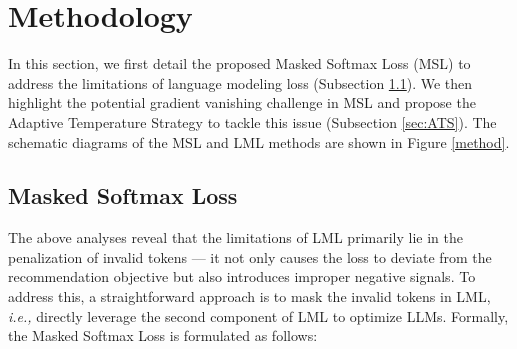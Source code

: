 \documentclass[sigconf,natbib=true]{acmart}
\newcommand{\ie}{\emph{i.e., }}
\begin{document}

\section{Methodology}
In this section, we first detail the proposed Masked Softmax Loss (MSL) to address the limitations of language modeling loss (Subsection \ref{sec:MSL}). We then highlight the potential gradient vanishing challenge in MSL and propose the Adaptive Temperature Strategy to tackle this issue (Subsection \ref{sec:ATS}). The schematic diagrams of the MSL and LML methods are shown in Figure \ref{method}.

\subsection{Masked Softmax Loss}
\label{sec:MSL}
The above analyses reveal that the limitations of LML primarily lie in the penalization of invalid tokens --- it not only causes the loss to deviate from the recommendation objective but also introduces improper negative signals. To address this, a straightforward approach is to mask the invalid tokens in LML, \ie directly leverage the second component of LML to optimize LLMs. Formally, the Masked Softmax Loss is formulated as follows:
\end{document}
